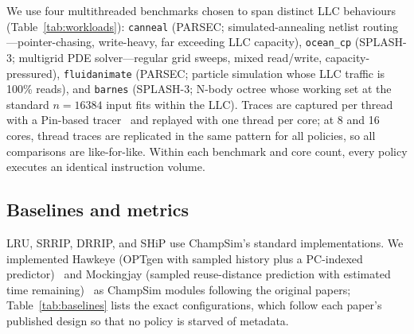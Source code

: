 \documentclass[conference]{IEEEtran}
\begin{document}
We use four multithreaded benchmarks chosen to span distinct LLC behaviours (Table~\ref{tab:workloads}): \texttt{canneal} (PARSEC; simulated-annealing netlist routing---pointer-chasing, write-heavy, far exceeding LLC capacity), \texttt{ocean\_cp} (SPLASH-3; multigrid PDE solver---regular grid sweeps, mixed read/write, capacity-pressured), \texttt{fluidanimate} (PARSEC; particle simulation whose LLC traffic is 100\% reads), and \texttt{barnes} (SPLASH-3; N-body octree whose working set at the standard $n{=}16384$ input fits within the LLC). Traces are captured per thread with a Pin-based tracer~\cite{luk2005pin} and replayed with one thread per core; at 8 and 16 cores, thread traces are replicated in the same pattern for all policies, so all comparisons are like-for-like. Within each benchmark and core count, every policy executes an identical instruction volume.

\begin{table}[htbp]
    \centering
    \renewcommand{\arraystretch}{1.2}
    \caption{Workload characterisation at the shared LLC (8 cores)}
    \label{tab:workloads}
\end{table}

\subsection{Baselines and metrics}

LRU, SRRIP, DRRIP, and SHiP use ChampSim's standard implementations. We implemented Hawkeye (OPTgen with sampled history plus a PC-indexed predictor)~\cite{jain2016hawkeye} and Mockingjay (sampled reuse-distance prediction with estimated time remaining)~\cite{shah2022mockingjay} as ChampSim modules following the original papers; Table~\ref{tab:baselines} lists the exact configurations, which follow each paper's published design so that no policy is starved of metadata.
\end{document}

